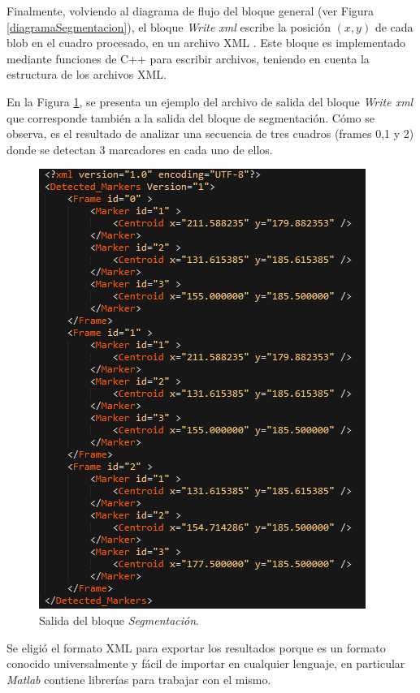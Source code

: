 Finalmente, volviendo al diagrama de flujo del bloque general (ver Figura \ref{diagramaSegmentacion}), el bloque \emph{Write xml} escribe la posición $(x,y)$ de cada blob en el cuadro procesado, en un archivo XML \cite{xml}. Este bloque es implementado mediante funciones de C++ para escribir archivos, teniendo en cuenta la estructura de los archivos XML.

En la Figura \ref{salidaxml}, se presenta un ejemplo del archivo de salida del bloque \emph{Write xml} que corresponde también a la salida del bloque de segmentación. Cómo se observa, es el resultado de analizar una secuencia de tres cuadros (frames 0,1 y 2) donde se detectan 3 marcadores en cada uno de ellos.

\begin{figure}[ht!]
\begin{center}
\includegraphics[scale=0.9]{img/salidaXml.png}
\end{center}
\caption{Salida del bloque \emph{Segmentación}.}
\label{salidaxml}
\end{figure}


 Se eligió el formato XML para exportar los resultados porque es un formato conocido universalmente y fácil de importar en cualquier lenguaje, en particular \emph{Matlab} contiene librerías para trabajar con el mismo.

